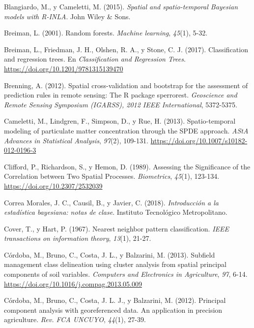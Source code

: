 \documentclass[11pt,b5paper,]{krantz}
\begin{document}
\leavevmode\hypertarget{ref-Blangiardo_Cameletti_2015}{}%
Blangiardo, M., y Cameletti, M. (2015). \emph{Spatial and spatio-temporal Bayesian models with R-INLA}. John Wiley \& Sons.

\leavevmode\hypertarget{ref-Breiman_2001}{}%
Breiman, L. (2001). Random forests. \emph{Machine learning}, \emph{45}(1), 5-32.

\leavevmode\hypertarget{ref-Breiman_Friedman_Olshen_Stone_2017}{}%
Breiman, L., Friedman, J. H., Olshen, R. A., y Stone, C. J. (2017). Classification and regression trees. En \emph{Classification and Regression Trees}. \url{https://doi.org/10.1201/9781315139470}

\leavevmode\hypertarget{ref-Brenning_2012}{}%
Brenning, A. (2012). Spatial cross-validation and bootstrap for the assessment of prediction rules in remote sensing: The R package sperrorest. \emph{Geoscience and Remote Sensing Symposium (IGARSS), 2012 IEEE International}, 5372-5375.

\leavevmode\hypertarget{ref-Cameletti_Lindgren_Simpson_Rue_2013}{}%
Cameletti, M., Lindgren, F., Simpson, D., y Rue, H. (2013). Spatio-temporal modeling of particulate matter concentration through the SPDE approach. \emph{AStA Advances in Statistical Analysis}, \emph{97}(2), 109-131. \url{https://doi.org/10.1007/s10182-012-0196-3}

\leavevmode\hypertarget{ref-Clifford_Richardson_Hemon_1989}{}%
Clifford, P., Richardson, S., y Hemon, D. (1989). Assessing the Significance of the Correlation between Two Spatial Processes. \emph{Biometrics}, \emph{45}(1), 123-134. \url{https://doi.org/10.2307/2532039}

\leavevmode\hypertarget{ref-Correa_Morales_Causil_Javier_2018}{}%
Correa Morales, J. C., Causil, B., y Javier, C. (2018). \emph{Introducción a la estadística bayesiana: notas de clase}. Instituto Tecnológico Metropolitano.

\leavevmode\hypertarget{ref-Cover_Hart_1967}{}%
Cover, T., y Hart, P. (1967). Nearest neighbor pattern classification. \emph{IEEE transactions on information theory}, \emph{13}(1), 21-27.

\leavevmode\hypertarget{ref-Cordoba2013}{}%
Córdoba, M., Bruno, C., Costa, J. L., y Balzarini, M. (2013). Subfield management class delineation using cluster analysis from spatial principal components of soil variables. \emph{Computers and Electronics in Agriculture}, \emph{97}, 6-14. \url{https://doi.org/10.1016/j.compag.2013.05.009}

\leavevmode\hypertarget{ref-Cuxf3rdoba_Balzarini_Bruno_Costa_Balzarini_Costa_2012}{}%
Córdoba, M., Bruno, C., Costa, J. L. J., y Balzarini, M. (2012). Principal component analysis with georeferenced data. An application in precision agriculture. \emph{Rev. FCA UNCUYO}, \emph{44}(1), 27-39.
\end{document}
